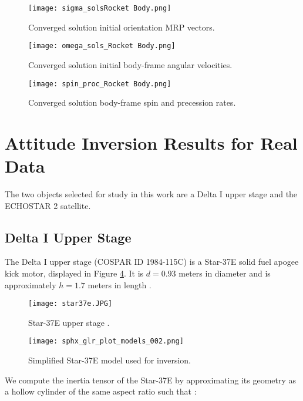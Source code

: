 \documentclass[a4paper,twocolumn]{spaceDebrisC} %
\newcommand{\figbig}[0]{0.5\textwidth}
\newcommand{\figsmall}[0]{0.3\textwidth}
\begin{document}
\begin{figure}[ht]
  \centering
  \texttt{[image: sigma\_solsRocket Body.png]}
  \caption{Converged solution initial orientation MRP vectors.}
  \label{fig:omega_sols1}
\end{figure}

\begin{figure}[ht]
  \centering
  \texttt{[image: omega\_sols\_Rocket Body.png]}
  \caption{Converged solution initial body-frame angular velocities.}
  \label{fig:omega_sols1}
\end{figure}

\begin{figure}[ht]
  \centering
  \texttt{[image: spin\_proc\_Rocket Body.png]}
  \caption{Converged solution body-frame spin and precession rates.}
  \label{fig:omega_sols1}
\end{figure}


\FloatBarrier
\section{Attitude Inversion Results for Real Data}

The two objects selected for study in this work are a Delta I upper stage and the ECHOSTAR 2 satellite.

\subsection{Delta I Upper Stage}

The Delta I upper stage (COSPAR ID 1984-115C) is a Star-37E \cite{delta3914_astronautix} solid fuel apogee kick motor, displayed in Figure \ref{fig:star37e}. It is $d=0.93$ meters in diameter and is approximately $h=1.7$ meters in length \cite{star37e_astronautix, star37_gunter}.

\begin{figure}[ht]
  \centering
  \texttt{[image: star37e.JPG]}
  \caption{Star-37E upper stage \cite{star37_af}.}
  \label{fig:star37e}
\end{figure}

\begin{figure}[ht]
  \centering
  \texttt{[image: sphx\_glr\_plot\_models\_002.png]}
  \caption{Simplified Star-37E model used for inversion.}
  \label{fig:star37e_simple}
\end{figure}

We compute the inertia tensor of the Star-37E by approximating its geometry as a hollow cylinder of the same aspect ratio such that \cite{serway2019}:
\end{document}
